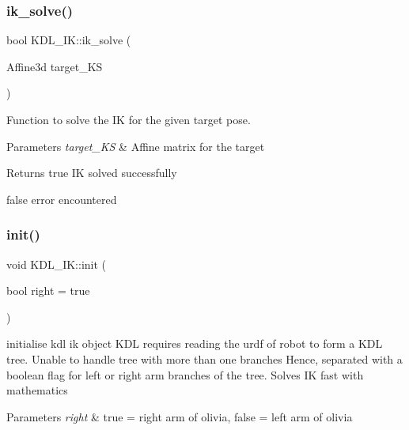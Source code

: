 \subsubsection{\texorpdfstring{ik\+\_\+solve()}{ik\_solve()}}
{\footnotesize\ttfamily bool K\+D\+L\+\_\+\+I\+K\+::ik\+\_\+solve (\begin{DoxyParamCaption}\item[{Affine3d}]{target\+\_\+\+KS }\end{DoxyParamCaption})\hspace{0.3cm}{\ttfamily [inline]}}



Function to solve the IK for the given target pose. 


\begin{DoxyParams}{Parameters}
{\em target\+\_\+\+KS} & Affine matrix for the target \\
\hline
\end{DoxyParams}
\begin{DoxyReturn}{Returns}
true IK solved successfully 

false error encountered 
\end{DoxyReturn}
\mbox{\label{classKDL__IK_aa7fb5139673aaa0c24620c51fad7e1d6}} 
\subsubsection{\texorpdfstring{init()}{init()}}
{\footnotesize\ttfamily void K\+D\+L\+\_\+\+I\+K\+::init (\begin{DoxyParamCaption}\item[{bool}]{right = {\ttfamily true} }\end{DoxyParamCaption})\hspace{0.3cm}{\ttfamily [inline]}}



initialise kdl ik object K\+DL requires reading the urdf of robot to form a K\+DL tree. Unable to handle tree with more than one branches Hence, separated with a boolean flag for left or right arm branches of the tree. Solves IK fast with mathematics 


\begin{DoxyParams}{Parameters}
{\em right} & true = right arm of olivia, false = left arm of olivia \\
\hline
\end{DoxyParams}
\mbox{\label{classKDL__IK_ab9717f11ad7991e06ed688ce1c803b85}} 
